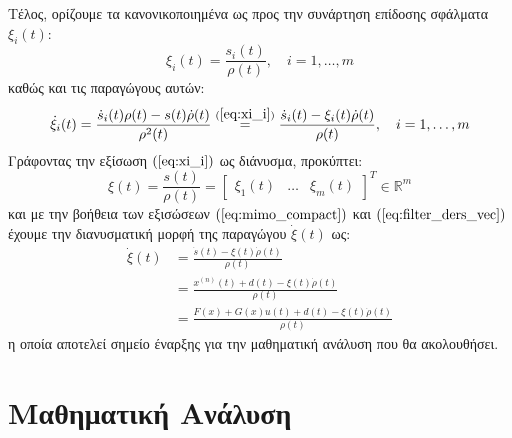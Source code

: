 Τέλος, ορίζουμε τα κανονικοποιημένα ως προς την συνάρτηση επίδοσης σφάλματα $\xi_i(t)$:
\begin{equation}
	\xi_i(t) = \frac{s_i(t)}{\rho(t)}, \quad i=1,\dots,m
	\label{eq:xi_i}
\end{equation}
καθώς και τις παραγώγους αυτών:
\begin{equation}
	\dot{\xi}_i(t) =
	\frac{\dot{s}_i(t) \rho(t) - s(t) \dot{\rho}(t)}
	{\rho^2(t)} \stackrel{(\ref{eq:xi_i})}{=}
	\frac{\dot{s}_i(t) - \xi_i(t) \dot{\rho}(t)}{\rho(t)},
	\quad i=1,\dots,m
	\label{eq:xi_i_dot}
\end{equation}
Γράφοντας την εξίσωση $(\ref{eq:xi_i})$ ως διάνυσμα, προκύπτει:
\begin{equation}
	\xi(t) = \frac{s(t)}{\rho(t)} = \begin{bmatrix}\xi_1(t) & \dots & \xi_m(t)\end{bmatrix}^T 
	\in \mathbb{R}^m
\end{equation}
και με την βοήθεια των εξισώσεων $(\ref{eq:mimo_compact})$ και  $(\ref{eq:filter_ders_vec})$ έχουμε την διανυσματική μορφή της παραγώγου $\dot{\xi}(t)$ ως:
\begin{equation}
\begin{split}
\dot{\xi}(t) &= \frac{\dot{s}(t) - \xi(t) \dot{\rho}(t)}{\rho(t)} \\
             &= \frac{x^{(n)}(t) + d(t) - \xi(t) \dot{\rho}(t)}{\rho(t)}\\
             &=\frac{F(x) + G(x)u(t) + d(t) - \xi(t)\dot{\rho}(t)}{\rho(t)}
\end{split}
\end{equation}
η οποία αποτελεί σημείο έναρξης για την μαθηματική ανάλυση που θα ακολουθήσει.

\section{Μαθηματική Ανάλυση}